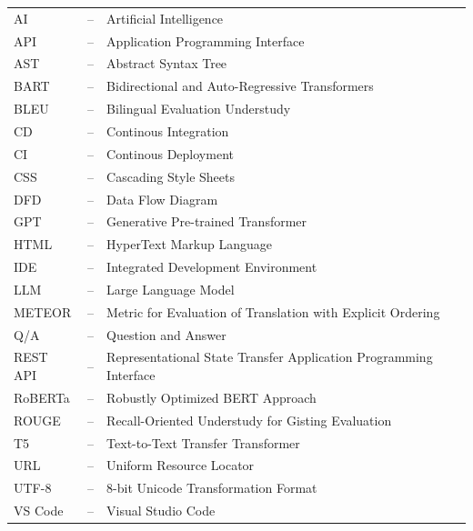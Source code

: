 \documentclass{cls/thesis}
\begin{document}
\begin{center}
\renewcommand{\arraystretch}{1.4}
\begin{tabular}{p{1.8cm}cp{10cm}}

AI         & -- & Artificial Intelligence \\
API        & -- & Application Programming Interface \\
AST        & -- & Abstract Syntax Tree \\
BART       & -- & Bidirectional and Auto-Regressive Transformers \\
BLEU       & -- & Bilingual Evaluation Understudy \\
CD        & -- & Continous Integration \\
CI         & -- & Continous Deployment \\
CSS        & -- & Cascading Style Sheets \\
DFD        & -- & Data Flow Diagram \\
GPT        & -- & Generative Pre-trained Transformer \\
HTML       & -- & HyperText Markup Language \\
IDE        & -- & Integrated Development Environment \\
LLM        & -- & Large Language Model \\
METEOR     & -- & Metric for Evaluation of Translation with Explicit Ordering \\
Q/A        & -- & Question and Answer \\
REST API & -- & Representational State Transfer Application Programming Interface \\
RoBERTa    & -- & Robustly Optimized BERT Approach \\
ROUGE      & -- & Recall-Oriented Understudy for Gisting Evaluation \\
T5         & -- & Text-to-Text Transfer Transformer \\
URL        & -- & Uniform Resource Locator \\
UTF-8      & -- & 8-bit Unicode Transformation Format \\
VS Code    & -- & Visual Studio Code \\

\end{tabular}
\end{center}
\newpage

\end{document}
